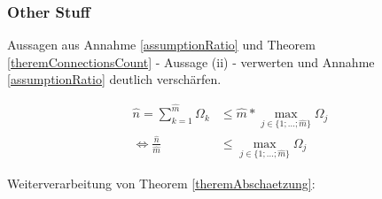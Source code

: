 \vspace{1cm}












\vspace{1cm}

\subsubsection{Other Stuff}
\label{sec:eco_zahlen_zustand_todo}

\vspace{2cm}
\vspace{0.3cm}

Aussagen aus Annahme \ref{assumptionRatio} und Theorem \ref{theremConnectionsCount} - Aussage (ii) - verwerten und Annahme \ref{assumptionRatio} deutlich verschärfen.

\vspace{0.3cm}

\begin{align*}
\widehat{n} = \sum_{k=1}^{\widehat{m}} \Omega_k &\leq \widehat{m} * \max_{j \in \{1;...;\widehat{m}\}} \Omega_j \\
\Leftrightarrow \frac{\widehat{n}}{\widehat{m}} &\leq \max_{j \in \{1;...;\widehat{m}\}} \Omega_j
\end{align*}
\vspace{0.3cm}

Weiterverarbeitung von Theorem \ref{theremAbschaetzung}:

\vspace{0.3cm}

